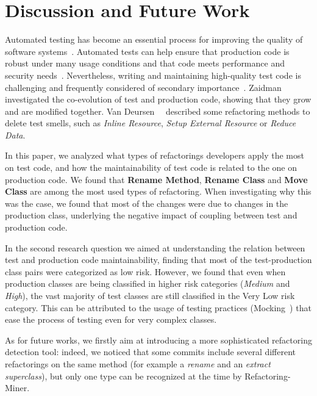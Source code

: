 \section{Discussion and Future Work}
\label{sec:futurework}
Automated testing has become an essential process for improving the quality of software systems~\cite{Spadini2018,Bertolino2007}. Automated tests can help ensure that production code is robust under many usage conditions and that code meets performance and security needs~\cite{Spadini2018,Bertolino2007}. Nevertheless, writing and maintaining high-quality test code is challenging and frequently considered of secondary importance~\cite{Spadini2018,Spadini,van2001refactoring}. Zaidman~\etal~\cite{Zaidman2008} investigated the
co-evolution of test and production code, showing that they grow and are modified together.
Van Deursen~\etal~\cite{van2001refactoring} described some refactoring methods 
to delete test smells, such as \textit{Inline Resource}, \textit{Setup External Resource}
or \textit{Reduce Data}.

In this paper, we analyzed what types of refactorings developers apply the most on test code, and how the maintainability of test code is related to the one on production code. We found that \textbf{Rename Method}, \textbf{Rename Class} and \textbf{Move Class} are among the most used types of refactoring. When investigating why this was the case, we found that most of the changes were due to changes in the production class, underlying the negative impact of coupling between test and production code. 

In the second research question we aimed at understanding the relation between test and production code maintainability, finding that most of the test-production class pairs were categorized as low risk. However, we found that even when production classes are being classified in higher risk categories (\eg \emph{Medium} and \emph{High}), the vast majority of test classes are still classified in the Very Low risk category. This can be attributed to the usage of testing practices (\eg Mocking~\cite{Spadini}) that ease the process of testing even for very complex classes.

As for future works, we firstly aim at introducing a more sophisticated refactoring detection tool: indeed, we noticed that some commits include several different refactorings on the same method (for example a \emph{rename} and an \emph{extract superclass}), but only one type can be recognized at the time by Refactoring-Miner. 

